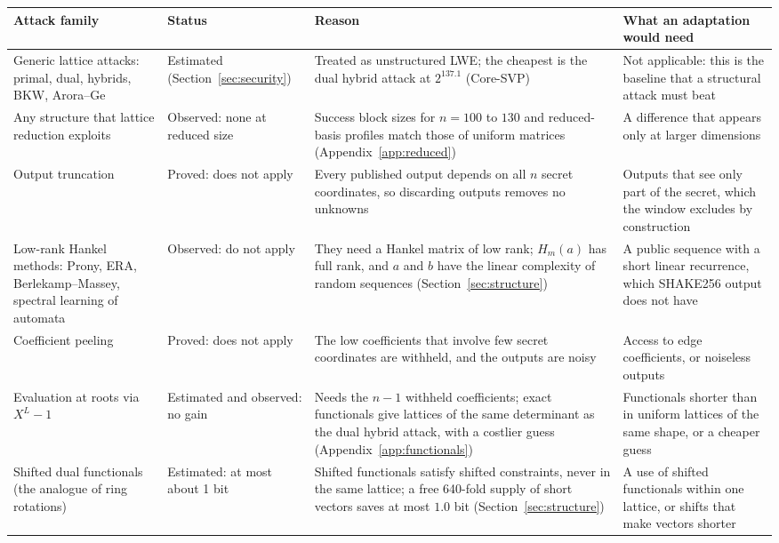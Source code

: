 \documentclass[11pt,a4paper]{article}
\theoremstyle{definition}
\begin{document}
\begin{table}[p]
\centering
\footnotesize
\renewcommand{\arraystretch}{1.0}
\begin{tabularx}{\textwidth}{@{}>{\raggedright\arraybackslash}p{2.55cm} >{\raggedright\arraybackslash}p{1.9cm} >{\raggedright\arraybackslash}X >{\raggedright\arraybackslash}X@{}}
\toprule
Attack family & Status & Reason & What an adaptation would need \\
\midrule
Generic lattice attacks: primal, dual, hybrids, BKW, Arora--Ge & Estimated (Section~\ref{sec:security}) & Treated as unstructured LWE; the cheapest is the dual hybrid attack at $2^{137.1}$ (Core-SVP) & Not applicable: this is the baseline that a structural attack must beat \\
Any structure that lattice reduction exploits & Observed: none at reduced size & Success block sizes for $n = 100$ to $130$ and reduced-basis profiles match those of uniform matrices (Appendix~\ref{app:reduced}) & A difference that appears only at larger dimensions \\
Output truncation~\cite{ssz2019practical} & Proved: does not apply & Every published output depends on all $n$ secret coordinates, so discarding outputs removes no unknowns & Outputs that see only part of the secret, which the window excludes by construction \\
Low-rank Hankel methods: Prony, ERA, Berlekamp--Massey, spectral learning of automata & Observed: do not apply & They need a Hankel matrix of low rank; $H_m(a)$ has full rank, and $a$ and $b$ have the linear complexity of random sequences (Section~\ref{sec:structure}) & A public sequence with a short linear recurrence, which SHAKE256 output does not have \\
Coefficient peeling~\cite{bai2020mpsign} & Proved: does not apply & The low coefficients that involve few secret coordinates are withheld, and the outputs are noisy & Access to edge coefficients, or noiseless outputs \\
Evaluation at roots via $X^L - 1$~\cite{elos2015weak} & Estimated and observed: no gain & Needs the $n - 1$ withheld coefficients; exact functionals give lattices of the same determinant as the dual hybrid attack, with a costlier guess (Appendix~\ref{app:functionals}) & Functionals shorter than in uniform lattices of the same shape, or a cheaper guess \\
Shifted dual functionals (the analogue of ring rotations) & Estimated: at most about 1 bit & Shifted functionals satisfy shifted constraints, never in the same lattice; a free 640-fold supply of short vectors saves at most $1.0$ bit (Section~\ref{sec:structure}) & A use of shifted functionals within one lattice, or shifts that make vectors shorter \\

\end{tabularx}
\end{table}
\end{document}
